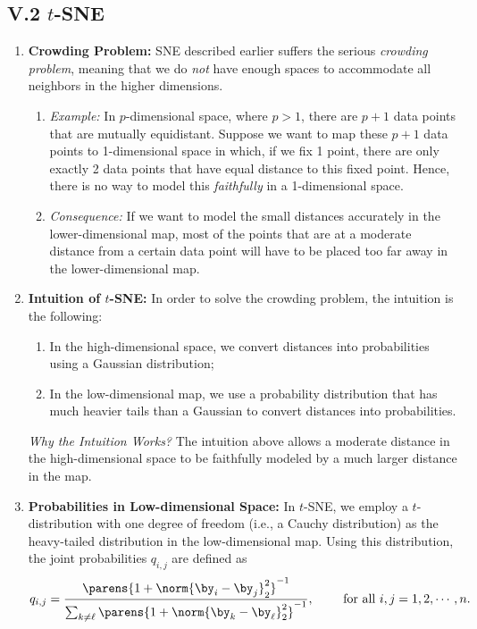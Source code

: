 \documentclass[12pt]{article}
\begin{document}
\subsection*{V.2 $t$-SNE}

\begin{enumerate}[label=\textbf{\arabic*.}]

	\item \textbf{Crowding Problem:} SNE described earlier suffers the serious \emph{crowding problem}, meaning that we do \emph{not} have enough spaces to accommodate all neighbors in the higher dimensions. 
	
	\begin{enumerate}
		
		\item \textit{Example:} In $p$-dimensional space, where $p > 1$, there are $p+1$ data points that are mutually equidistant. Suppose we want to map these $p+1$ data points to 1-dimensional space in which, if we fix 1 point, there are only exactly 2 data points that have equal distance to this fixed point. Hence, there is no way to model this \emph{faithfully} in a 1-dimensional space. 
		
		\item \textit{Consequence:} If we want to model the small distances accurately in the lower-dimensional map, most of the points that are at a moderate distance from a certain data point will have to be placed too far away in the lower-dimensional map. 
	\end{enumerate}
	
	\item \textbf{Intuition of $t$-SNE:} In order to solve the crowding problem, the intuition is the following: 
	\begin{enumerate}
		\item In the high-dimensional space, we convert distances into probabilities using a Gaussian distribution; 
		\item In the low-dimensional map, we use a probability distribution that has much heavier tails than a Gaussian to convert distances into probabilities. 
	\end{enumerate}
	
	\textit{Why the Intuition Works?} The intuition above allows a moderate distance in the high-dimensional space to be faithfully modeled by a much larger distance in the map. 
	
	\item \textbf{Probabilities in Low-dimensional Space:} In $t$-SNE, we employ a $t$-distribution with one degree of freedom (i.e., a Cauchy distribution) as the heavy-tailed distribution in the low-dimensional map. Using this distribution, the joint probabilities $q_{i,j}$ are defined as 
	\begin{align}\label{eq-q-t-dist}
		q_{i,j} = \frac{\parens{1 + \norm{\by_i - \by_j}_2^2}^{-1}}{\sum_{k \neq \ell} \parens{1 + \norm{\by_k - \by_{\ell}}_2^2}^{-1}}, \qquad \text{ for all } i, j = 1, 2, \cdots, n. 
	\end{align}
	

\end{enumerate}
\end{document}
